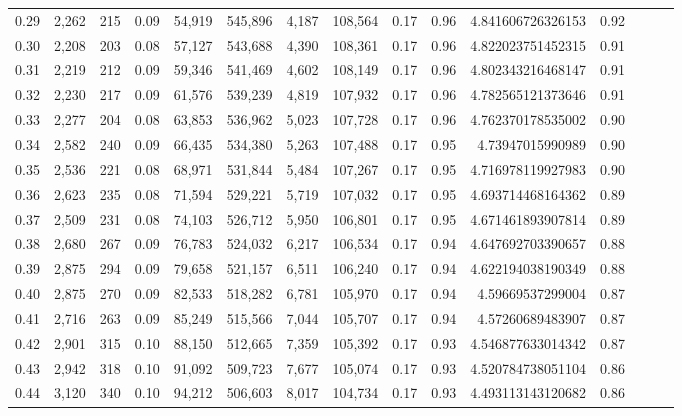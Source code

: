 \begin{tabular}{rrrrrrrrrrrrrrr}
0.29 &   2,262 &    215 &  0.09 &   54,919 &  545,896 &    4,187 &  108,564 &  0.17 &  0.96 &     4.841606726326153 &      0.92 \\
0.30 &   2,208 &    203 &  0.08 &   57,127 &  543,688 &    4,390 &  108,361 &  0.17 &  0.96 &     4.822023751452315 &      0.91 \\
0.31 &   2,219 &    212 &  0.09 &   59,346 &  541,469 &    4,602 &  108,149 &  0.17 &  0.96 &     4.802343216468147 &      0.91 \\
0.32 &   2,230 &    217 &  0.09 &   61,576 &  539,239 &    4,819 &  107,932 &  0.17 &  0.96 &     4.782565121373646 &      0.91 \\
0.33 &   2,277 &    204 &  0.08 &   63,853 &  536,962 &    5,023 &  107,728 &  0.17 &  0.96 &     4.762370178535002 &      0.90 \\
0.34 &   2,582 &    240 &  0.09 &   66,435 &  534,380 &    5,263 &  107,488 &  0.17 &  0.95 &      4.73947015990989 &      0.90 \\
0.35 &   2,536 &    221 &  0.08 &   68,971 &  531,844 &    5,484 &  107,267 &  0.17 &  0.95 &     4.716978119927983 &      0.90 \\
0.36 &   2,623 &    235 &  0.08 &   71,594 &  529,221 &    5,719 &  107,032 &  0.17 &  0.95 &     4.693714468164362 &      0.89 \\
0.37 &   2,509 &    231 &  0.08 &   74,103 &  526,712 &    5,950 &  106,801 &  0.17 &  0.95 &     4.671461893907814 &      0.89 \\
0.38 &   2,680 &    267 &  0.09 &   76,783 &  524,032 &    6,217 &  106,534 &  0.17 &  0.94 &     4.647692703390657 &      0.88 \\
0.39 &   2,875 &    294 &  0.09 &   79,658 &  521,157 &    6,511 &  106,240 &  0.17 &  0.94 &     4.622194038190349 &      0.88 \\
0.40 &   2,875 &    270 &  0.09 &   82,533 &  518,282 &    6,781 &  105,970 &  0.17 &  0.94 &      4.59669537299004 &      0.87 \\
0.41 &   2,716 &    263 &  0.09 &   85,249 &  515,566 &    7,044 &  105,707 &  0.17 &  0.94 &      4.57260689483907 &      0.87 \\
0.42 &   2,901 &    315 &  0.10 &   88,150 &  512,665 &    7,359 &  105,392 &  0.17 &  0.93 &     4.546877633014342 &      0.87 \\
0.43 &   2,942 &    318 &  0.10 &   91,092 &  509,723 &    7,677 &  105,074 &  0.17 &  0.93 &     4.520784738051104 &      0.86 \\
0.44 &   3,120 &    340 &  0.10 &   94,212 &  506,603 &    8,017 &  104,734 &  0.17 &  0.93 &     4.493113143120682 &      0.86 \\

\end{tabular}
